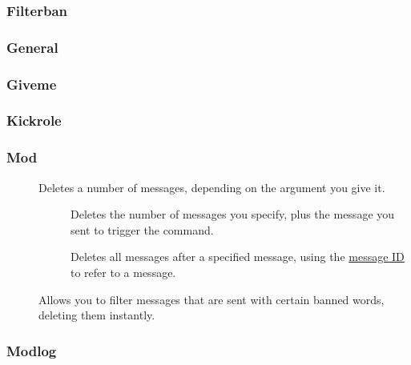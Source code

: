 \subsubsection{Filterban}

\subsubsection{General}

\subsubsection{Giveme}

\subsubsection{Kickrole}

\subsubsection{Mod}
\begin{description}
	
	\item[]\label{com:cleanup}
		Deletes a number of messages, depending on the argument you give it.
		
	\begin{description}
		
		\item[]\label{com:cleanup-messages}
			Deletes the number of messages you specify, plus the message you sent to trigger the command.
		\item[]\label{com:cleanup-after}
			Deletes all messages after a specified message, using the \hyperref[discord:message-id]{message ID} to refer to a message.
			
	\end{description}

	\item[]\label{com:filter}
		Allows you to filter messages that are sent with certain banned words, deleting them instantly.
		
\end{description}

\subsubsection{Modlog}

